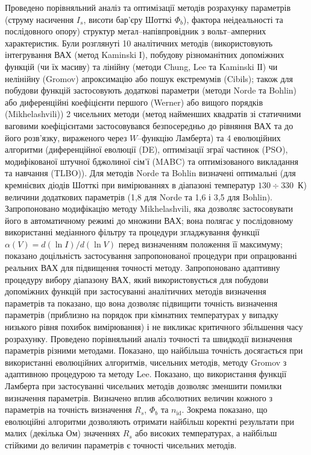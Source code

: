 Проведено порівняльний аналіз та оптимізації методів розрахунку параметрів (струму насичення  $I_s$, висоти бар'єру Шотткі  $\Phi_b$), фактора неідеальності та послідовного опору) структур метал--напівпровідник з вольт--амперних характеристик.
Були розглянуті 10 аналітичних методів (використовують інтегрування ВАХ (метод Kaminski І), побудову різноманітних допоміжних функцій (чи їх масиву) та лінійну (методи Chung, Lee та Kaminski ІІ) чи нелінійну (Gromov) апроксимацію або пошук екстремумів (Cibils);
також для побудови функцій застосовують додаткові параметри (методи Norde та Bohlin) або диференційні коефіцієнти першого (Werner) або вищого порядків (Mikhelashvili))
2 чисельних методи (метод найменших квадратів зі статичними ваговими коефіцієнтами застосовувався безпосередньо до рівняння ВАХ та до його розв'язку, вираженого через $W$--функцію Ламберта) та
4 еволюційних алгоритми (диференційної еволюції (DE),
оптимізації зграї частинок (PSO),
модифікованої штучної бджолиної сім'ї (MABC) та
оптимізованого викладання та навчання (TLBO)).
Для методів Norde та Bohlin визначені  оптимальні (для кремнієвих діодів Шотткі при вимірюваннях в діапазоні температур $130\div330$~К) величини додаткових параметрів (1,8 для Norde та 1,6 і 3,5 для Bohlin).
Запропоновано модифікацію методу Mikhelashvili, яка дозволяє застосовувати його в автоматичному режимі до множини ВАХ;
вона полягає у послідовному використанні медіанного фільтру та процедури згладжування функції $\alpha(V)=d(\ln I)/d(\ln V)$ перед визначенням положення її максимуму;
показано доцільність застосування запропонованої процедури при опрацюванні реальних ВАХ для підвищення точності методу.
Запропоновано адаптивну процедуру вибору діапазону ВАХ, який використовується для побудови допоміжних функцій при застосуванні аналітичних методів визначення параметрів та показано, що вона дозволяє підвищити точність визначення параметрів (приблизно на порядок при кімнатних температурах у випадку низького рівня похибок вимірювання) і не викликає критичного збільшення часу розрахунку.
Проведено порівняльний аналіз точності  та швидкодії  визначення параметрів різними методами.
Показано, що найбільша точність досягається при використанні еволюцiйних алгоритмів, чисельних методів, методу Gromov з адаптивною процедурою та методу Lee.
Показано, що використання функції Ламберта при застосуванні чисельних методів дозволяє зменшити помилки визначення параметрів.
Визначено вплив абсолютних величин кожного з параметрів на точність визначення $R_s$, $\Phi_b$ та $n_\mathrm{id}$.
Зокрема показано, що еволюційні алгоритми дозволяють отримати найбільш коректні результати при малих (декілька Ом) значеннях $R_s$ або високих температурах, а найбільш стійкими до величин параметрів є точності чисельних методів.


